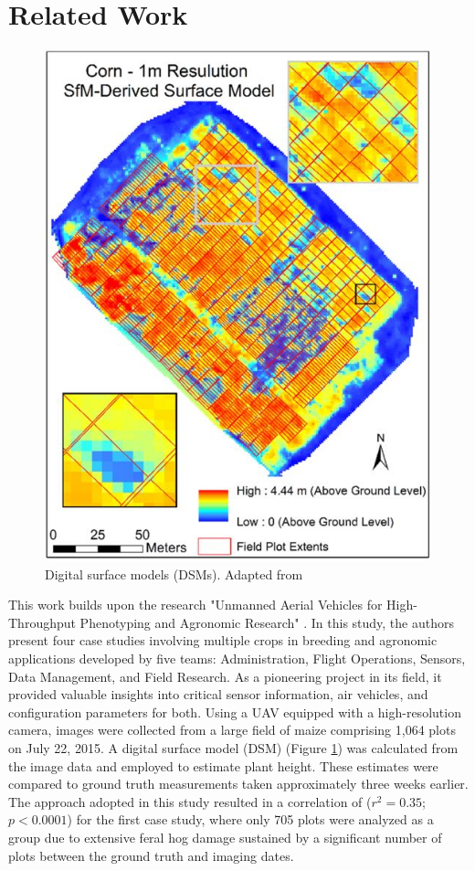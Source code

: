 \section{Related Work}
\label{sec:related_work}

\begin{figure}[t]
\includegraphics[width=\linewidth]{../images/DSM}
\caption{Digital surface models (DSMs). Adapted from \cite{UAV_HTPAR_2016}}
\label{fig:DSM}
\end{figure}

This work builds upon the research "Unmanned Aerial Vehicles for High-Throughput Phenotyping and Agronomic Research" \cite{UAV_HTPAR_2016}. In this study, the authors present four case studies involving multiple crops in breeding and agronomic applications developed by five teams: Administration, Flight Operations, Sensors, Data Management, and Field Research. As a pioneering project in its field, it provided valuable insights into critical sensor information, air vehicles, and configuration parameters for both. Using a UAV equipped with a high-resolution camera, images were collected from a large field of maize comprising 1,064 plots on July 22, 2015. A digital surface model (DSM) (Figure \ref{fig:DSM}) was calculated from the image data and employed to estimate plant height. These estimates were compared to ground truth measurements taken approximately three weeks earlier. The approach adopted in this study resulted in a correlation of ($r^2 = 0.35$; $p<0.0001$) for the first case study, where only 705 plots were analyzed as a group due to extensive feral hog damage sustained by a significant number of plots between the ground truth and imaging dates.

